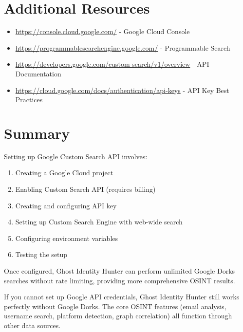 \documentclass[11pt,a4paper]{article}
\begin{document}
\section{Additional Resources}

\begin{itemize}
    \item \url{https://console.cloud.google.com/} - Google Cloud Console
    \item \url{https://programmablesearchengine.google.com/} - Programmable Search
    \item \url{https://developers.google.com/custom-search/v1/overview} - API Documentation
    \item \url{https://cloud.google.com/docs/authentication/api-keys} - API Key Best Practices
\end{itemize}

\section{Summary}

Setting up Google Custom Search API involves:

\begin{enumerate}
    \item Creating a Google Cloud project
    \item Enabling Custom Search API (requires billing)
    \item Creating and configuring API key
    \item Setting up Custom Search Engine with web-wide search
    \item Configuring environment variables
    \item Testing the setup
\end{enumerate}

Once configured, Ghost Identity Hunter can perform unlimited Google Dorks searches without rate limiting, providing more comprehensive OSINT results.

\begin{tcolorbox}[colback=googlegreen!10,colframe=googlegreen,title=Alternative]
If you cannot set up Google API credentials, Ghost Identity Hunter still works perfectly without Google Dorks. The core OSINT features (email analysis, username search, platform detection, graph correlation) all function through other data sources.
\end{tcolorbox}
\end{document}
